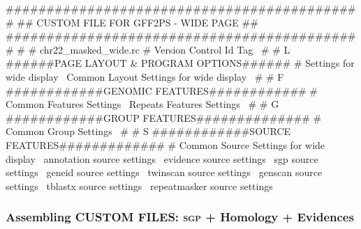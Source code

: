 \documentclass[11pt]{article}
\def\nwendcode{\endtrivlist \endgroup} %
\let\nwdocspar=\par                    %
\newcommand{\subsubsctn}[1]{\subsubsection{#1}}
\def\sgp{\textsc{sgp}}
\begin{document}
\nwenddocs{}\endmoddef
############################################
##   CUSTOM FILE FOR GFF2PS - WIDE PAGE   ##
############################################
#
# chr22_masked_wide.rc
#
\LA{}Version Control Id Tag~{\nwtagstyle{}}\RA{}
#
# L ######PAGE LAYOUT & PROGRAM OPTIONS######
#
\LA{}Settings for wide display~{\nwtagstyle{}}\RA{}
\LA{}Common Layout Settings for wide display~{\nwtagstyle{}}\RA{}
#
# F ############GENOMIC FEATURES############
#
\LA{}Common Features Settings~{\nwtagstyle{}}\RA{}
\LA{}Repeats Features Settings~{\nwtagstyle{}}\RA{}
#
# G ############GROUP FEATURES##############
#
\LA{}Common Group Settings~{\nwtagstyle{}}\RA{}
#
# S ############SOURCE FEATURES#############
#
\LA{}Common Source Settings for wide display~{\nwtagstyle{}}\RA{}
\LA{}annotation source settings~{\nwtagstyle{}}\RA{}
\LA{}evidence source settings~{\nwtagstyle{}}\RA{}
\LA{}sgp source settings~{\nwtagstyle{}}\RA{}
\LA{}geneid source settings~{\nwtagstyle{}}\RA{}
\LA{}twinscan source settings~{\nwtagstyle{}}\RA{}
\LA{}genscan source settings~{\nwtagstyle{}}\RA{}
\LA{}tblastx source settings~{\nwtagstyle{}}\RA{}
\LA{}repeatmasker source settings~{\nwtagstyle{}}\RA{}
\nwendcode{}\nwdocspar

\subsubsctn{Assembling CUSTOM FILES: {\sgp} + Homology + Evidences}
\end{document}
